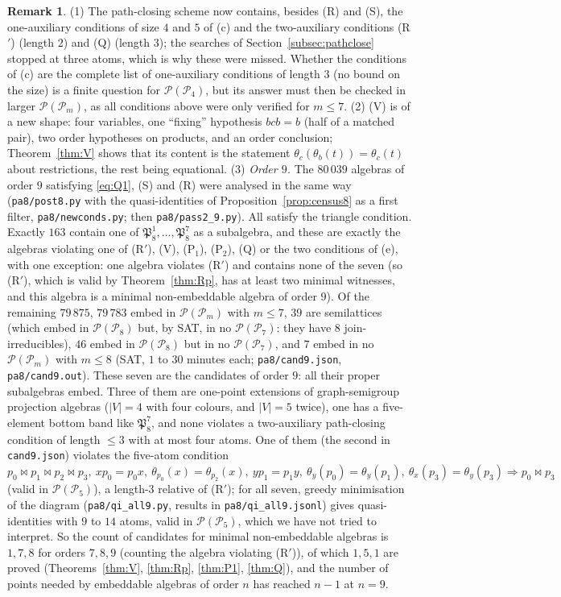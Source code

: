 \documentclass[11pt]{amsart}
\theoremstyle{definition}
\newtheorem{remark}[theorem]{Remark}
\renewcommand{\P}{\mathcal{P}}
\begin{document}
\begin{remark}\label{rem:census8}
(1) The path-closing scheme now contains, besides (R) and (S), the one-auxiliary conditions of size $4$ and $5$ of (c) and the two-auxiliary conditions (R$'$) (length $2$) and (Q) (length $3$); the searches of Section~\ref{subsec:pathclose} stopped at three atoms, which is why these were missed. Whether the conditions of (c) are the complete list of one-auxiliary conditions of length $3$ (no bound on the size) is a finite question for $\P(\P_4)$, but its answer must then be checked in larger $\P(\P_m)$, as all conditions above were only verified for $m\le7$. (2) (V) is of a new shape: four variables, one ``fixing'' hypothesis $bcb=b$ (half of a matched pair), two order hypotheses on products, and an order conclusion; Theorem~\ref{thm:V} shows that its content is the statement $\theta_c(\theta_b(t))=\theta_c(t)$ about restrictions, the rest being equational. (3) \emph{Order $9$.} The $80\,039$ algebras of order $9$ satisfying \eqref{eq:Q1}, (S) and (R) were analysed in the same way (\texttt{pa8/post8.py} with the quasi-identities of Proposition~\ref{prop:census8} as a first filter, \texttt{pa8/newconds.py}; then \texttt{pa8/pass2\_9.py}). All satisfy the triangle condition. Exactly $163$ contain one of $\mathfrak P_8^1,\dots,\mathfrak P_8^7$ as a subalgebra, and these are exactly the algebras violating one of (R$'$), (V), (P$_1$), (P$_2$), (Q) or the two conditions of (e), with one exception: one algebra violates (R$'$) and contains none of the seven (so (R$'$), which is valid by Theorem~\ref{thm:Rp}, has at least two minimal witnesses, and this algebra is a minimal non-embeddable algebra of order $9$). Of the remaining $79\,875$, $79\,783$ embed in $\P(\P_m)$ with $m\le7$, $39$ are semilattices (which embed in $\P(\P_8)$ but, by SAT, in no $\P(\P_7)$: they have $8$ join-irreducibles), $46$ embed in $\P(\P_8)$ but in no $\P(\P_7)$, and $7$ embed in no $\P(\P_m)$ with $m\le8$ (SAT, $1$ to $30$ minutes each; \texttt{pa8/cand9.json}, \texttt{pa8/cand9.out}). These seven are the candidates of order $9$: all their proper subalgebras embed. Three of them are one-point extensions of graph-semigroup projection algebras ($|V|=4$ with four colours, and $|V|=5$ twice), one has a five-element bottom band like $\mathfrak P_8^7$, and none violates a two-auxiliary path-closing condition of length $\le3$ with at most four atoms. One of them (the second in \texttt{cand9.json}) violates the five-atom condition $p_0\bowtie p_1\bowtie p_2\bowtie p_3,\ xp_0=p_0x,\ \theta_{p_0}(x)=\theta_{p_2}(x),\ yp_1=p_1y,\ \theta_y(p_0)=\theta_y(p_1),\ \theta_x(p_3)=\theta_y(p_3)\Rightarrow p_0\bowtie p_3$ (valid in $\P(\P_5)$), a length-$3$ relative of (R$'$); for all seven, greedy minimisation of the diagram (\texttt{pa8/qi\_all9.py}, results in \texttt{pa8/qi\_all9.jsonl}) gives quasi-identities with $9$ to $14$ atoms, valid in $\P(\P_5)$, which we have not tried to interpret. So the count of candidates for minimal non-embeddable algebras is $1, 7, 8$ for orders $7, 8, 9$ (counting the algebra violating (R$'$)), of which $1,5,1$ are proved (Theorems~\ref{thm:V}, \ref{thm:Rp}, \ref{thm:P1}, \ref{thm:Q}), and the number of points needed by embeddable algebras of order $n$ has reached $n-1$ at $n=9$.

\end{remark}
\end{document}
